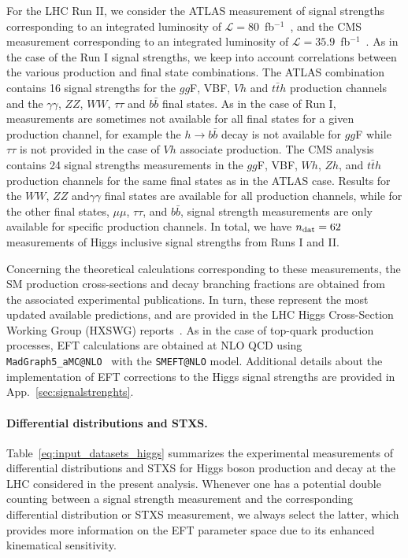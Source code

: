 For the LHC Run II, we consider the ATLAS measurement of signal strengths
corresponding to an integrated luminosity of
$\mathcal{L}=80$~fb$^{-1}$~\cite{Aad:2019mbh}, and the CMS measurement
corresponding to an integrated luminosity of
$\mathcal{L}=35.9$~fb$^{-1}$~\cite{Sirunyan:2018koj}.
As in the case of the Run I signal strengths, we keep into account
correlations between the various production and final state combinations.
The ATLAS combination contains 16 signal strengths
for the $gg$F, VBF, $Vh$ and $t\bar{t}h$ production channels
and the $\gamma\gamma$, $ZZ$, $WW$, $\tau\tau$ and $b\bar{b}$
final states. As in the case of Run I, measurements are sometimes not available
for all final states for a given production channel, for example the
$h\to b\bar{b}$ decay is not available for $gg$F while $\tau\tau$ is not
provided in the case of $Vh$ associate production.
The CMS analysis contains 24 signal strengths measurements
in the $gg$F, VBF, $Wh$, $Zh$, and $t\bar{t}h$ production channels
for the same final states as in the ATLAS case. Results for the
$WW$, $ZZ$ and$\gamma\gamma$ final states are available for all production
channels, while for the other final states, $\mu\mu$, $\tau\tau$,
and $b\bar{b}$, signal strength measurements
are only available for specific production channels.
In total, we have $n_{\rm dat}=62$ measurements
of Higgs inclusive signal strengths from Runs I and II.

Concerning the theoretical calculations corresponding to these
measurements, the SM production cross-sections and decay branching fractions
are obtained from the associated experimental publications.
%
In turn,
these represent the
most updated available predictions, and are provided in the LHC Higgs
Cross-Section Working Group (HXSWG)
reports~\cite{Heinemeyer:2013tqa,deFlorian:2016spz,Dittmaier:2012vm}.
As in the case of top-quark production processes,
EFT calculations are obtained at NLO QCD
using {\tt MadGraph5\_aMC@NLO}~\cite{Alwall:2014hca} with the
{\tt SMEFT@NLO} model.
%
Additional details about the implementation of EFT
corrections to the Higgs signal strengths are provided
in App.~\ref{sec:signalstrenghts}.

\paragraph{Differential distributions and STXS.}
Table~\ref{eq:input_datasets_higgs} summarizes the experimental measurements of
differential distributions and STXS for Higgs boson production and decay at the
LHC considered in the present analysis.
%
Whenever one has a potential double counting between a
signal strength measurement and the corresponding differential distribution or
STXS measurement, we always select the latter, which provides more information
on the EFT parameter space due to its enhanced
kinematical sensitivity.

